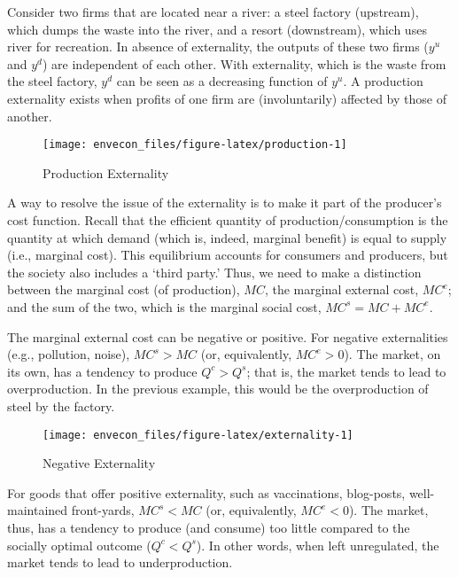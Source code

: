 \documentclass[
]{book}
\begin{document}
Consider two firms that are located near a river: a steel factory (upstream), which dumps the waste into the river, and a resort (downstream), which uses river for recreation. In absence of externality, the outputs of these two firms (\(y^u\) and \(y^d\)) are independent of each other. With externality, which is the waste from the steel factory, \(y^d\) can be seen as a decreasing function of \(y^u\). A production externality exists when profits of one firm are (involuntarily) affected by those of another.

\begin{figure}

{\centering \texttt{[image: envecon\_files/figure-latex/production-1]} 

}

\caption{Production Externality}\label{fig:production}
\end{figure}

A way to resolve the issue of the externality is to make it part of the producer's cost function. Recall that the efficient quantity of production/consumption is the quantity at which demand (which is, indeed, marginal benefit) is equal to supply (i.e., marginal cost). This equilibrium accounts for consumers and producers, but the society also includes a `third party.' Thus, we need to make a distinction between the marginal cost (of production), \(MC\), the marginal external cost, \(MC^e\); and the sum of the two, which is the marginal social cost, \(MC^s = MC+MC^e\).

The marginal external cost can be negative or positive. For negative externalities (e.g., pollution, noise), \(MC^s > MC\) (or, equivalently, \(MC^e > 0\)). The market, on its own, has a tendency to produce \(Q^c>Q^s\); that is, the market tends to lead to overproduction. In the previous example, this would be the overproduction of steel by the factory.

\begin{figure}

{\centering \texttt{[image: envecon\_files/figure-latex/externality-1]} 

}

\caption{Negative Externality}\label{fig:externality}
\end{figure}

For goods that offer positive externality, such as vaccinations, blog-posts, well-maintained front-yards, \(MC^s < MC\) (or, equivalently, \(MC^e < 0\)). The market, thus, has a tendency to produce (and consume) too little compared to the socially optimal outcome (\(Q^c < Q^s\)). In other words, when left unregulated, the market tends to lead to underproduction.
\end{document}
